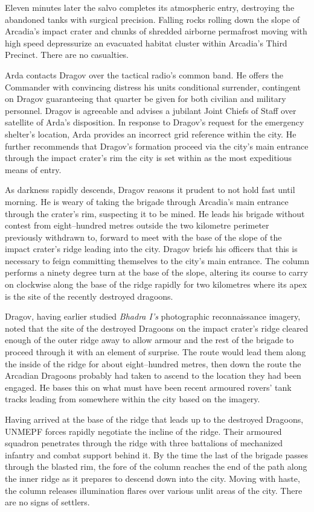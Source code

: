 Eleven minutes later the salvo completes its atmospheric entry, destroying the abandoned tanks with surgical precision. Falling rocks rolling down the slope of Arcadia's impact crater and chunks of shredded airborne permafrost moving with high speed depressurize an evacuated habitat cluster within Arcadia's Third Precinct. There are no casualties.

Arda contacts Dragov over the tactical radio's common band. He offers the Commander with convincing distress his units conditional surrender, contingent on Dragov guaranteeing that quarter be given for both civilian and military personnel. Dragov is agreeable and advises a jubilant Joint Chiefs of Staff over satellite of Arda's disposition. In response to Dragov's request for the emergency shelter's location, Arda provides an incorrect grid reference within the city. He further recommends that Dragov's formation proceed via the city's main entrance through the impact crater's rim the city is set within as the most expeditious means of entry.

As darkness rapidly descends, Dragov reasons it prudent to not hold fast until morning. He is weary of taking the brigade through Arcadia's main entrance through the crater's rim, suspecting it to be mined. He leads his brigade without contest from eight--hundred metres outside the two kilometre perimeter previously withdrawn to, forward to meet with the base of the slope of the impact crater's ridge leading into the city. Dragov briefs his officers that this is necessary to feign committing themselves to the city's main entrance. The column performs a ninety degree turn at the base of the slope, altering its course to carry on clockwise along the base of the ridge rapidly for two kilometres where its apex is the site of the recently destroyed dragoons.

Dragov, having earlier studied {\it Bhadra I's} photographic reconnaissance imagery, noted that the site of the destroyed Dragoons on the impact crater's ridge cleared enough of the outer ridge away to allow armour and the rest of the brigade to proceed through it with an element of surprise. The route would lead them along the inside of the ridge for about eight--hundred metres, then down the route the Arcadian Dragoons probably had taken to ascend to the location they had been engaged. He bases this on what must have been recent armoured rovers' tank tracks leading from somewhere within the city based on the imagery.

Having arrived at the base of the ridge that leads up to the destroyed Dragoons, UNMEPF forces rapidly negotiate the incline of the ridge. Their armoured squadron penetrates through the ridge with three battalions of mechanized infantry and combat support behind it. By the time the last of the brigade passes through the blasted rim, the fore of the column reaches the end of the path along the inner ridge as it prepares to descend down into the city. Moving with haste, the column releases illumination flares over various unlit areas of the city. There are no signs of settlers.

